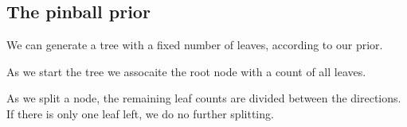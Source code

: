 
\subsection{The pinball prior}

We can generate a tree with a fixed number of leaves, according to our prior.

As we start the tree we assocaite the root node with a count of all leaves.

As we split a node, the remaining leaf counts are divided between the directions. If there is only one leaf left, we do no further splitting.

